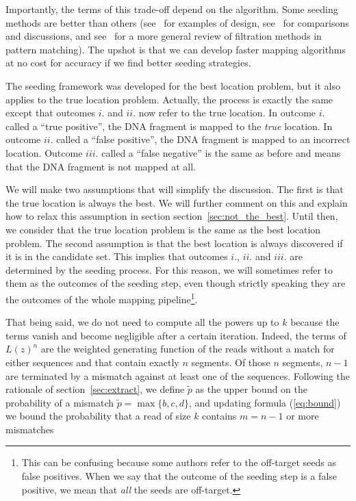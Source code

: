\documentclass{article}
\begin{document}
Importantly, the terms of this trade-off depend on the algorithm. Some
seeding methods are better than others (see~\cite{pmid20460430,
sun2005designing,pmid11934743,xu2006optimizing,pmid17044164,
brejova2003vector,pmid18684737,pmid15359419} for examples of design,
see~\cite{pmid16533404, pmid20460430} for comparisons and discussions, and
see~\cite{navarro2001guided} for a more general review of filtration
methods in pattern matching). The upshot is that we can develop faster
mapping algorithms at no cost for accuracy if we find better seeding
strategies.

The seeding framework was developed for the best location problem, but it
also applies to the true location problem. Actually, the process is
exactly the same except that outcomes $i.$ and $ii.$ now refer to the true
location. In outcome $i.$ called a ``true positive'', the DNA fragment is
mapped to the \emph{true} location. In outcome $ii.$ called a ``false
positive'', the DNA fragment is mapped to an incorrect location. Outcome
$iii.$ called a ``false negative'' is the same as before and means that
the DNA fragment is not mapped at all.

We will make two assumptions that will simplify the discussion. The first
is that the true location is always the best. We will further comment on
this and explain how to relax this assumption in section
section~\ref{sec:not_the_best}. Until then, we consider that the true
location problem is the same as the best location problem. The second
assumption is that the best location is always discovered if it is in the
candidate set. This implies that outcomes $i.$, $ii.$ and $iii.$ are
determined by the seeding process. For this reason, we will sometimes
refer to them as the outcomes of the seeding step, even though strictly
speaking they are the outcomes of the whole mapping pipeline\footnote{This
can be confusing because some authors refer to the off-target seeds as
false positives. When we say that the outcome of the seeding step is a
false positive, we mean that \emph{all} the seeds are off-target.}.


That being said, we do not need to compute all the powers up to $k$
because the terms vanish and become negligible after a certain iteration.
Indeed, the terms of $L(z)^n$ are the weighted generating function of the
reads without a match for either sequences and that contain exactly $n$
segments. Of those $n$ segments, $n-1$ are terminated by a mismatch
against at least one of the sequences. Following the rationale of
section~\ref{sec:extract}, we define $\tilde{p}$ as the upper bound on the
probability of a mismatch $\tilde{p} = \max\{b,c,d\}$, and updating
formula (\ref{eq:bound}) we bound the probability that a read of size $k$
contains $m = n-1$ or more mismatches
\end{document}
